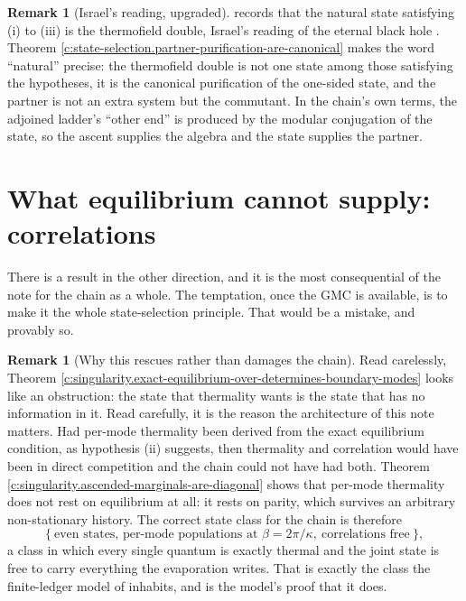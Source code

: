\documentclass[11pt]{article}
\theoremstyle{definition}
\newtheorem{remark}[theorem]{Remark}
\theoremstyle{plain}
\begin{document}
\begin{remark}[Israel's reading, upgraded]\label{c:note.state-selection.israels-reading-upgraded}
\cite[Rem.~7.4]{ButlerT5} records that the natural state satisfying (i) to (iii) is the thermofield double, Israel's reading of the eternal black hole \cite{Israel1976}. Theorem \ref{c:state-selection.partner-purification-are-canonical} makes the word ``natural'' precise: the thermofield double is not one state among those satisfying the hypotheses, it is the canonical purification of the one-sided state, and the partner is not an extra system but the commutant. In the chain's own terms, the adjoined ladder's ``other end'' is produced by the modular conjugation of the state, so the ascent supplies the algebra and the state supplies the partner.
\end{remark}

\section{What equilibrium cannot supply: correlations}

\label{c:note.state-selection.setting-what-equilibrium-cannot-supply-correlations}
There is a result in the other direction, and it is the most consequential of the note for the chain as a whole. The temptation, once the GMC is available, is to make it the whole state-selection principle. That would be a mistake, and provably so.

\begin{remark}[Why this rescues rather than damages the chain]\label{c:note.state-selection.why-rescues-rather-than-damages-chain}
Read carelessly, Theorem \ref{c:singularity.exact-equilibrium-over-determines-boundary-modes} looks like an obstruction: the state that thermality wants is the state that has no information in it. Read carefully, it is the reason the architecture of this note matters. Had per-mode thermality been derived from the exact equilibrium condition, as hypothesis (ii) suggests, then thermality and correlation would have been in direct competition and the chain could not have had both. Theorem \ref{c:singularity.ascended-marginals-are-diagonal} shows that per-mode thermality does not rest on equilibrium at all: it rests on parity, which survives an arbitrary non-stationary history. The correct state class for the chain is therefore
\[
\bigl\{\ \text{even states, per-mode populations at } \beta = 2\pi/\kappa, \ \text{correlations free}\ \bigr\},
\]
a class in which every single quantum is exactly thermal and the joint state is free to carry everything the evaporation writes. That is exactly the class the finite-ledger model of \cite[\S 12]{ButlerT5} inhabits, and \cite[Lem.~12.1]{ButlerT5} is the model's proof that it does.
\end{remark}
\end{document}
